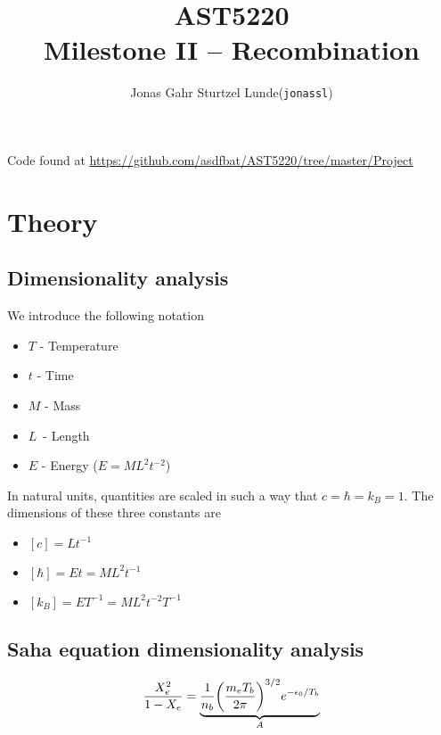 \documentclass[10pt, a4paper]{article}
\begin{document}
\title{AST5220\\ Milestone II -- Recombination}
\author{
    \begin{tabular}{r l}
        Jonas Gahr Sturtzel Lunde & (\texttt{jonassl})
    \end{tabular}}

\maketitle
Code found at \url{https://github.com/asdfbat/AST5220/tree/master/Project}
\vspace{0.7cm}

\section{Theory}

\subsection{Dimensionality analysis}
We introduce the following notation
\begin{itemize}
    \item $T$ - Temperature
    \item $t$ - Time
    \item $M$ - Mass
    \item $L$ - Length
    \item $E$ - Energy ($E = ML^2t^{-2}$)
\end{itemize}

In natural units, quantities are scaled in such a way that $c = \hbar = k_B = 1$. The dimensions of these three constants are
\begin{itemize}
    \item $[c] = Lt^{-1}$
    \item $[\hbar] = Et = ML^2t^{-1}$
    \item $[k_B] = ET^{-1} = ML^2t^{-2}T^{-1}$
\end{itemize}

\subsection{Saha equation dimensionality analysis}
\begin{equation}
    \frac{X_{e}^{2}}{1-X_{e}}= \underbrace{\frac{1}{n_{b}}\qty(\frac{m_{e} T_{b}}{2 \pi})^{3 / 2} e^{-\epsilon_{0} / T_{b}}}_A
\end{equation}
\end{document}

